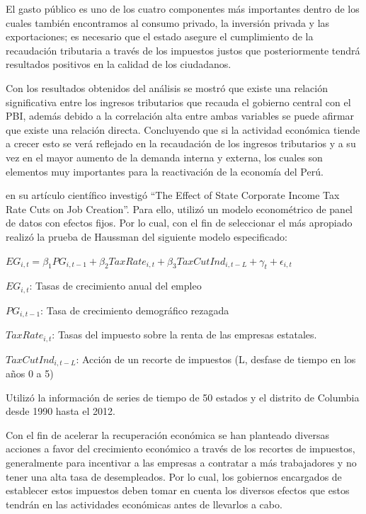 \documentclass[
  letterpaper,
  DIV=11,
  numbers=noendperiod]{scrartcl}
\begin{document}
El gasto público es uno de los cuatro componentes más importantes dentro
de los cuales también encontramos al consumo privado, la inversión
privada y las exportaciones; es necesario que el estado asegure el
cumplimiento de la recaudación tributaria a través de los impuestos
justos que posteriormente tendrá resultados positivos en la calidad de
los ciudadanos.

Con los resultados obtenidos del análisis se mostró que existe una
relación significativa entre los ingresos tributarios que recauda el
gobierno central con el PBI, además debido a la correlación alta entre
ambas variables se puede afirmar que existe una relación directa.
Concluyendo que si la actividad económica tiende a crecer esto se verá
reflejado en la recaudación de los ingresos tributarios y a su vez en el
mayor aumento de la demanda interna y externa, los cuales son elementos
muy importantes para la reactivación de la economía del Perú.

\textcite{shuai_effect_2013} en su artículo científico investigó ``The
Effect of State Corporate Income Tax Rate Cuts on Job Creation''. Para
ello, utilizó un modelo econométrico de panel de datos con efectos
fijos. Por lo cual, con el fin de seleccionar el más apropiado realizó
la prueba de Haussman del siguiente modelo especificado:

\(EG_{i, t} = \beta_{1}PG_{i, t-1} + \beta_{2}TaxRate_{i, t} + \beta_{3}TaxCutInd_{i, t-L} + \gamma_{t} + \epsilon_{i, t}\)

\(EG_{i, t}\): Tasas de crecimiento anual del empleo

\(PG_{i, t-1}\): Tasa de crecimiento demográfico rezagada

\(TaxRate_{i, t}\): Tasas del impuesto sobre la renta de las empresas
estatales.

\(TaxCutInd_{i, t-L}\): Acción de un recorte de impuestos (L, desfase de
tiempo en los años 0 a 5)

Utilizó la información de series de tiempo de 50 estados y el distrito
de Columbia desde 1990 hasta el 2012.

Con el fin de acelerar la recuperación económica se han planteado
diversas acciones a favor del crecimiento económico a través de los
recortes de impuestos, generalmente para incentivar a las empresas a
contratar a más trabajadores y no tener una alta tasa de desempleados.
Por lo cual, los gobiernos encargados de establecer estos impuestos
deben tomar en cuenta los diversos efectos que estos tendrán en las
actividades económicas antes de llevarlos a cabo.
\end{document}
